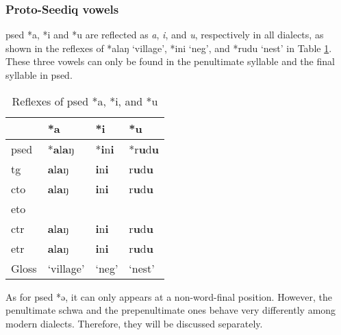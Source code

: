 \subsubsection{Proto-Seediq vowels} \label{sec:psedV}


\acl{psed} *a, *i and *u are reflected as \textit{a}, \textit{i}, and \textit{u}, respectively in all dialects, as shown in the reflexes of *alaŋ `village', *ini `\acs{neg}', and *rudu `nest' in Table \ref{tab:psed_aiu}. These three vowels can only be found in the penultimate syllable and the final syllable in \acl{psed}.  

\begin{table}[]
\centering
\caption{Reflexes of \acl{psed} *a, *i, and *u}
\label{tab:psed_aiu}
\begin{tabular}{llll}
\hline
           & *a        & *i          & *u     \\ \hline
\acs{psed} & *\textbf{a}l\textbf{a}ŋ     & *\textbf{i}n\textbf{i}        & *r\textbf{u}d\textbf{u}  \\ \hdashline
\acs{tg}   & \textbf{a}l\textbf{a}ŋ      & \textbf{i}n\textbf{i}         & r\textbf{u}d\textbf{u}   \\
\acs{cto}  & \textbf{a}l\textbf{a}ŋ      & \textbf{i}n\textbf{i}         & r\textbf{u}d\textbf{u}   \\
\acs{eto}  &           &             &        \\
\acs{ctr}  & \textbf{a}l\textbf{a}ŋ      & \textbf{i}n\textbf{i}         & r\textbf{u}d\textbf{u}   \\
\acs{etr}  & \textbf{a}l\textbf{a}ŋ      & \textbf{i}n\textbf{i}         & r\textbf{u}d\textbf{u}   \\ \hline
Gloss      & `village' & `\acs{neg}' & `nest' \\ \hline
\end{tabular}
\end{table}

As for \acl{psed} *ə, it can only appears at a non-word-final position. However, the penultimate schwa and the prepenultimate ones behave very differently among modern dialects. Therefore, they will be discussed separately. 

